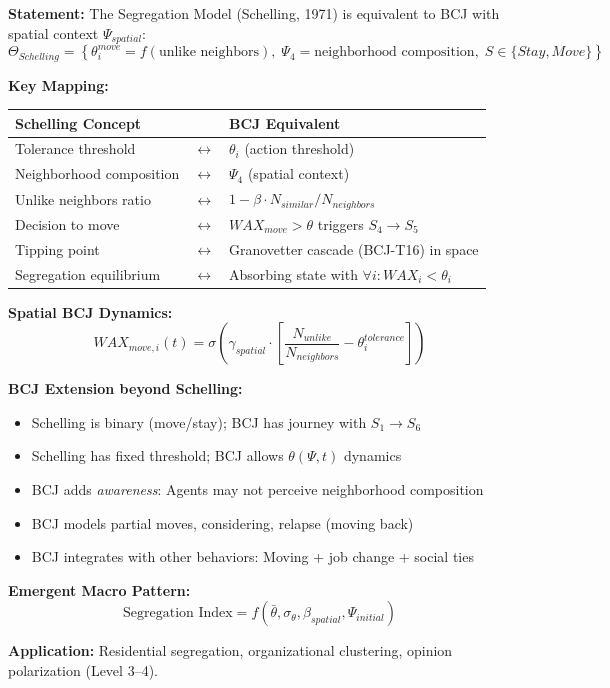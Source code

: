 \begin{tcolorbox}[colback=green!5!white, colframe=green!75!black,
    title=Theorem BCJ-T20: Schelling Segregation Model as Special Case]
\textbf{Statement:} The Segregation Model (Schelling, 1971) is equivalent to BCJ with spatial context $\Psi_{spatial}$:
\begin{equation}
\Theta_{Schelling} = \left\{\theta_i^{move} = f(\text{unlike neighbors}), \; \Psi_4 = \text{neighborhood composition}, \; S \in \{Stay, Move\}\right\}
\end{equation}

\textbf{Key Mapping:}
\begin{center}
\begin{tabular}{lcl}
\toprule
\textbf{Schelling Concept} & & \textbf{BCJ Equivalent} \\
\midrule
Tolerance threshold & $\leftrightarrow$ & $\theta_i$ (action threshold) \\
Neighborhood composition & $\leftrightarrow$ & $\Psi_4$ (spatial context) \\
Unlike neighbors ratio & $\leftrightarrow$ & $1 - \beta \cdot N_{similar}/N_{neighbors}$ \\
Decision to move & $\leftrightarrow$ & $WAX_{move} > \theta$ triggers $S_4 \to S_5$ \\
Tipping point & $\leftrightarrow$ & Granovetter cascade (BCJ-T16) in space \\
Segregation equilibrium & $\leftrightarrow$ & Absorbing state with $\forall i: WAX_i < \theta_i$ \\
\bottomrule
\end{tabular}
\end{center}

\textbf{Spatial BCJ Dynamics:}
\begin{equation}
WAX_{move,i}(t) = \sigma\left(\gamma_{spatial} \cdot \left[\frac{N_{unlike}}{N_{neighbors}} - \theta_i^{tolerance}\right]\right)
\end{equation}

\textbf{BCJ Extension beyond Schelling:}
\begin{itemize}[nosep]
\item Schelling is binary (move/stay); BCJ has journey with $S_1 \to S_6$
\item Schelling has fixed threshold; BCJ allows $\theta(\Psi, t)$ dynamics
\item BCJ adds \textit{awareness}: Agents may not perceive neighborhood composition
\item BCJ models partial moves, considering, relapse (moving back)
\item BCJ integrates with other behaviors: Moving + job change + social ties
\end{itemize}

\textbf{Emergent Macro Pattern:}
\begin{equation}
\text{Segregation Index} = f\left(\bar{\theta}, \sigma_\theta, \beta_{spatial}, \Psi_{initial}\right)
\end{equation}

\textbf{Application:} Residential segregation, organizational clustering, opinion polarization (Level 3--4).
\end{tcolorbox}

